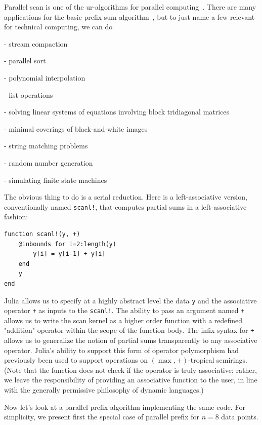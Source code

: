 \documentclass{sig-alternate}
\newcommand{\code}[1]{\texttt{#1}}
\begin{document}
Parallel scan is one of the ur-algorithms for parallel computing~\cite{Kruskal1985,Blelloch1989,Bell2012}.
There are many applications for the basic prefix sum algorithm~\cite{Blelloch1990,Blelloch1993}, but to just name a few relevant for technical computing, we can do 

- stream compaction~\cite{Harris2007}

- parallel sort~\cite{Blelloch1989}

- polynomial interpolation~\cite{Egecioglu1990}

- list operations~\cite{Hillis1986,Gorlatch1999}

- solving linear systems of equations involving block tridiagonal matrices~\cite{Mathias1995}

- minimal coverings of black-and-white images~\cite{Moitra1991}

- string matching problems~\cite{Chi1992}

- random number generation~\cite{Lu1996}

- simulating finite state machines~\cite{Ladner1980}

The obvious thing to do is a serial reduction. Here is a left-associative
version, conventionally named \code{scanl!}, that computes partial sums in a
left-associative fashion:

\begin{verbatim}
function scanl!(y, +)
    @inbounds for i=2:length(y)
        y[i] = y[i-1] + y[i]
    end
    y
end
\end{verbatim}

Julia allows us to specify at a highly abstract level the data \code{y} and the
associative operator \code{+} as inputs to the \code{scanl!}. The ability to
pass an argument named \code{+} allows us to write the scan kernel as a higher
order function with a redefined "addition" operator within the scope of the
function body. The infix syntax for \code{+} allows us to generalize the notion
of partial sums transparently to any associative operator. Julia's ability to
support this form of operator polymorphism had previously been used to support
operations on $(\max,+)$-tropical semirings.~\cite{Shah2013}
(Note that the function does not check if the operator is truly
associative; rather, we leave the responsibility of providing an associative
function to the user, in line with the generally permissive philosophy of
dynamic languages.)

Now let's look at a parallel prefix algorithm implementing the same code.  For
simplicity, we present first the special case of parallel prefix for $n=8$ data
points.
\end{document}
